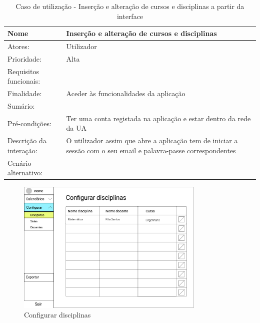 \documentclass[11pt, twoside]{report}
\begin{document}
	
\begin{table}[H]
	\caption{Caso de utilização - Inserção e alteração de cursos e disciplinas a partir da interface}
	\begin{center}	
		\begin{tabularx}{\textwidth}{|l|X|}
			\hline
			\textbf{Nome }	& \textbf{Inserção e alteração de cursos e disciplinas} \\
			\hline
			Atores: & Utilizador \\
			\hline
			Prioridade: & Alta \\
			\hline
			Requisitos funcionais:&  \\
			\hline
			Finalidade: & Aceder às funcionalidades da aplicação\\
			\hline
			Sumário: &  \\
			\hline
			Pré-condições: & Ter uma conta registada na aplicação e estar dentro da rede da UA\\
			\hline
			Descrição da interação: &  O utilizador assim que abre a aplicação tem de iniciar a sessão com o seu email e palavra-passe correspondentes\\
			\hline
			Cenário alternativo:&\\
			\hline
		\end{tabularx}
	\end{center}
\end{table}

	\begin{figure}[H] 
		\centering 
		\includegraphics[width=0.8\textwidth,height=0.8\textheight,keepaspectratio]{image/prototipowireframes/configurardisciplinas}
		\caption{Configurar disciplinas}
	\end{figure}
\end{document}
